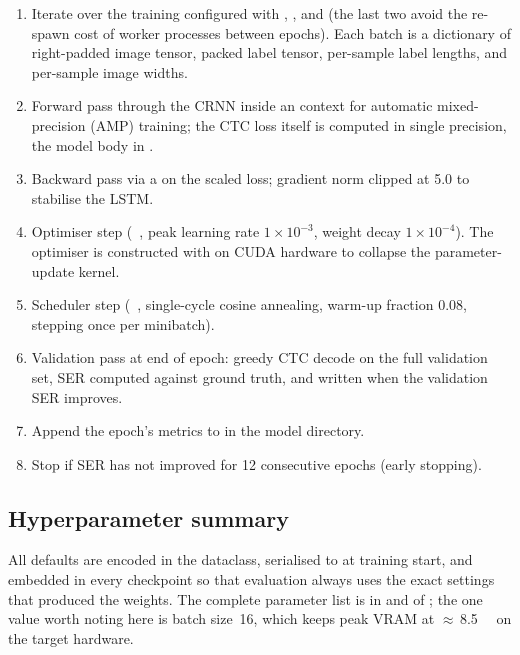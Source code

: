 \begin{enumerate}
    \item Iterate over the training  configured with
          , , and
           (the last two avoid the
          re-spawn cost of worker processes between epochs).  Each
          batch is a dictionary of right-padded image tensor, packed
          label tensor, per-sample label lengths, and per-sample image
          widths.
    \item Forward pass through the CRNN inside an
           context for automatic
          mixed-precision (AMP) training; the CTC loss itself is
          computed in single precision, the model body in
          .
    \item Backward pass via a  on the
          scaled loss; gradient norm clipped at \num{5.0} to stabilise
          the LSTM.
    \item Optimiser step (~\cite{loshchilovDecoupledWeightDecay2019},
          peak learning rate $1{\times}10^{-3}$,
          weight decay $1{\times}10^{-4}$).  The optimiser is
          constructed with  on CUDA hardware to
          collapse the parameter-update kernel.
    \item Scheduler step (~\cite{smithSuperConvergenceVeryFast2019},
          single-cycle cosine annealing, warm-up fraction \num{0.08},
          stepping once per minibatch).
    \item Validation pass at end of epoch: greedy CTC decode on the
          full validation set, SER computed against ground truth, and
           written when the validation SER
          improves.
    \item Append the epoch's metrics to  in
          the model directory.
    \item Stop if SER has not improved for \num{12} consecutive epochs
          (early stopping).
\end{enumerate}

\subsection{Hyperparameter summary}

All defaults are encoded in the  dataclass, serialised to
 at training start, and embedded in every checkpoint
so that evaluation always uses the exact settings that produced the
weights.
The complete parameter list is in  and
 of ; the one value worth
noting here is batch size~16, which keeps peak VRAM at
$\approx$\,\SI{8.5}{\giga\byte} on the target hardware.


